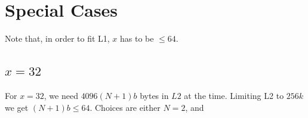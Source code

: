   \section{Special Cases}

  Note that, in order to fit L1, $x$ has to be $\le 64$.

  \subsection{$x=32$}

  For $x=32$, we need $4096(N+1)b$ bytes in $L2$ at the time.  Limiting L2 to $256k$ we get $(N+1)b \le 64$.  Choices are either $N=2$, and
